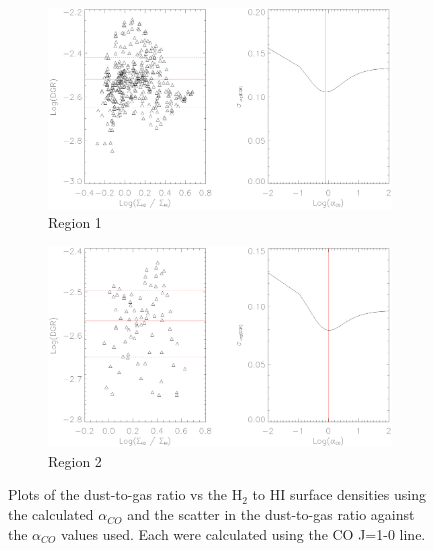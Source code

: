 \begin{figure}\label{fig:dgr_co10}
  \begin{subfigure}[t]{1\textwidth}
    \centering
    \includegraphics[width=1.\textwidth]{dgr_imgs/region_1_aco_output_10.eps}
    \caption{Region 1}
  \end{subfigure}

  \begin{subfigure}[t]{1\textwidth}
    \centering
    \includegraphics[width=1.\textwidth]{dgr_imgs/region_2_aco_output_10.eps}
    \caption{Region 2}
  \end{subfigure}
   \caption[Dust-to-Gas Ratio Determination Plots for CO J=1-0]{Plots of the dust-to-gas ratio vs the H$_2$ to HI surface densities using the calculated $\alpha_{CO}$ and the scatter in the dust-to-gas ratio against the $\alpha_{CO}$ values used.  Each were calculated using the CO J=1-0 line.}
   \label{fig:dgr_co10}
\end{figure}

